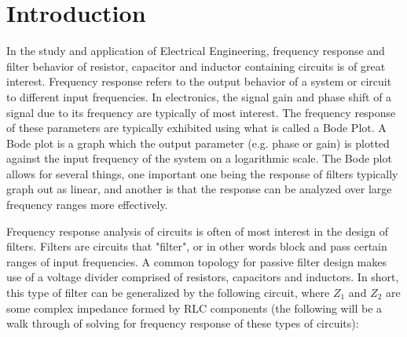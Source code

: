 \documentclass[12pt]{article}
\begin{document}
\section{Introduction}
%
In the study and application of Electrical Engineering, frequency response and filter behavior of resistor, capacitor and inductor containing circuits is of great interest. Frequency response refers to the output behavior of a system or circuit to different input frequencies. In electronics, the signal gain and phase shift of a signal due to its frequency are typically of most interest. The frequency response of these parameters are typically exhibited using what is called a Bode Plot. A Bode plot is a graph which the output parameter (e.g. phase or gain) is plotted against the input frequency of the system on a logarithmic scale. The Bode plot allows for several things, one important one being the response of filters typically graph out as linear, and another is that the response can be analyzed over large frequency ranges more effectively. \\\par

Frequency response analysis of circuits is often of most interest in the design of filters. Filters are circuits that "filter", or in other words block and pass certain ranges of input frequencies. A common topology for passive filter design makes use of a voltage divider comprised of resistors, capacitors and inductors. In short, this type of filter can be generalized by the following circuit, where $Z_1$ and $Z_2$ are some complex impedance formed by RLC components (the following will be a walk through of solving for frequency response of these types of circuits):
\end{document}
